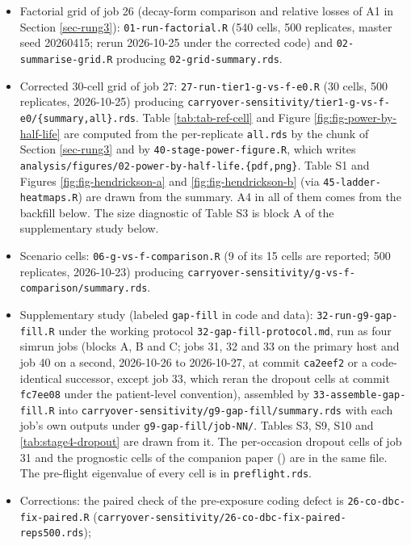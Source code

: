 \documentclass[
  11pt,
]{article}
\providecommand{\tightlist}{%
  \setlength{\itemsep}{0pt}\setlength{\parskip}{0pt}}
\begin{document}
\begin{itemize}
\tightlist
\item
  Factorial grid of job 26 (decay-form comparison and relative losses
  of A1 in Section \ref{sec-rung3}): \texttt{01-run-factorial.R} (540 cells,
  500 replicates, master seed 20260415; rerun 2026-10-25 under the
  corrected code) and \texttt{02-summarise-grid.R} producing
  \texttt{02-grid-summary.rds}.
\item
  Corrected 30-cell grid of job 27: \texttt{27-run-tier1-g-vs-f-e0.R} (30
  cells, 500 replicates, 2026-10-25) producing
  \texttt{carryover-sensitivity/tier1-g-vs-f-e0/\{summary,all\}.rds}. Table
  \ref{tab:tab-ref-cell} and Figure \ref{fig:fig-power-by-half-life}
  are computed from the per-replicate \texttt{all.rds} by the chunk of
  Section \ref{sec-rung3} and by \texttt{40-stage-power-figure.R}, which writes
  \texttt{analysis/figures/02-power-by-half-life.\{pdf,png\}}. Table S1 and
  Figures \ref{fig:fig-hendrickson-a} and
  \ref{fig:fig-hendrickson-b} (via \texttt{45-ladder-heatmaps.R}) are drawn
  from the summary. A4 in all of them comes from the backfill below. The size
  diagnostic of Table S3 is block A of the
  supplementary study below.
\item
  Scenario cells: \texttt{06-g-vs-f-comparison.R} (9 of its 15 cells are
  reported; 500 replicates, 2026-10-23) producing
  \texttt{carryover-sensitivity/g-vs-f-comparison/summary.rds}.
\item
  Supplementary study (labeled \texttt{gap-fill} in code and data):
  \texttt{32-run-g9-gap-fill.R} under the working protocol
  \texttt{32-gap-fill-protocol.md}, run as four simrun jobs (blocks A, B
  and C; jobs 31, 32 and 33 on the primary host and job 40 on a
  second, 2026-10-26 to 2026-10-27, at commit \texttt{ca2eef2} or a
  code-identical successor, except job 33, which reran the dropout
  cells at commit \texttt{fc7ee08} under the patient-level convention),
  assembled by \texttt{33-assemble-gap-fill.R}
  into \texttt{carryover-sensitivity/g9-gap-fill/summary.rds} with each
  job's own outputs under \texttt{g9-gap-fill/job-NN/}. Tables
  S3, S9,
  S10 and \ref{tab:stage4-dropout} are drawn
  from it. The per-occasion dropout cells of job 31 and the
  prognostic cells of the companion paper () are
  in the same file. The pre-flight eigenvalue of every cell is in
  \texttt{preflight.rds}.
\item
  Corrections: the paired check of the pre-exposure coding defect is
  \texttt{26-co-dbc-fix-paired.R} (\texttt{carryover-sensitivity/26-co-dbc-fix-paired-reps500.rds});

\end{itemize}
\end{document}
